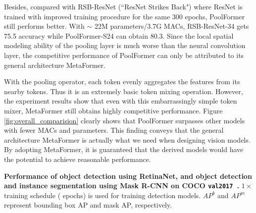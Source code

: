 Besides, compared with RSB-ResNet (``ResNet Strikes Back") \cite{resnet_improved} where ResNet \cite{resnet} is trained with improved training procedure for the same 300 epochs, PoolFormer still performs better. With $\sim$ 22M parameters/3.7G MACs, RSB-ResNet-34 \cite{resnet_improved} gets 75.5 accuracy while PoolFormer-S24 can obtain 80.3. Since the local spatial modeling ability of the pooling layer is much worse than the neural convolution layer, the competitive performance of PoolFormer can only be attributed to its general architecture MetaFormer.


With the pooling operator,  each token evenly aggregates the features from its nearby tokens. Thus it is an extremely basic token mixing operation. However, the experiment results show that even with this embarrassingly simple token mixer, MetaFormer still obtains highly competitive performance. 
Figure \ref{fig:overall_comparision} clearly shows that PoolFormer surpasses other models with fewer MACs and parameters. 
This finding conveys that the general architecture MetaFormer is actually what we need when designing vision models. By adopting MetaFormer, it is guaranteed that the derived models would have the potential to achieve reasonable performance. 

\begin{table}[t]
\small
\centering
\setlength{\tabcolsep}{2pt}

\vspace{-3mm}
\caption{\textbf{Performance of object detection using RetinaNet, and object detection and instance segmentation using Mask R-CNN on COCO \texttt{val2017}~\cite{coco}.} $1 \times$ training schedule ( epochs) is used for training detection models. $AP^b$ and $AP^m$ represent bounding box AP and mask AP, respectively.}
\label{tab:coco_det} 
\vspace{-3mm}
\end{table}


